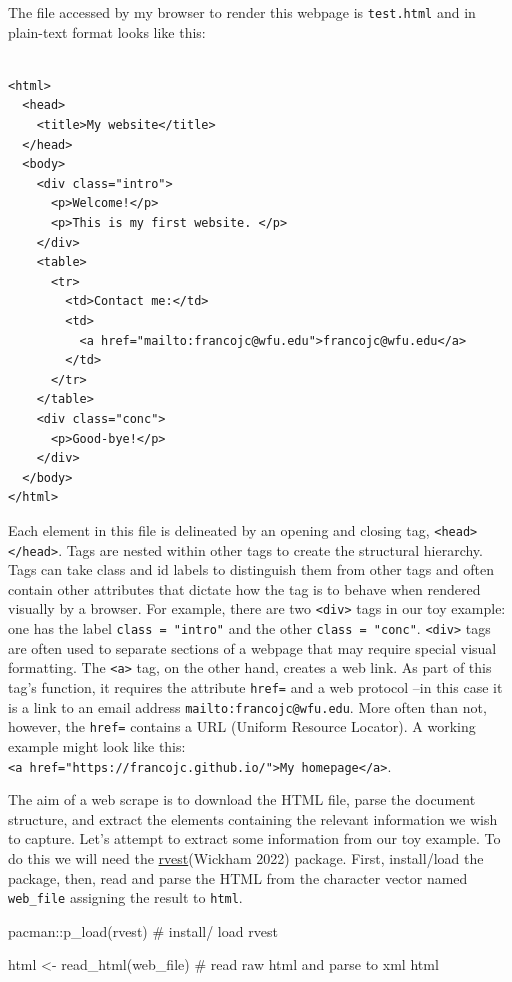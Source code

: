 \documentclass[
  letterpaper,
]{latex/krantz}
\newenvironment{Shaded}{\begin{snugshade}}{\end{snugshade}}
\newcommand{\CommentTok}[1]{\textcolor[rgb]{0.37,0.37,0.37}{#1}}
\newcommand{\FunctionTok}[1]{\textcolor[rgb]{0.28,0.35,0.67}{#1}}
\newcommand{\NormalTok}[1]{\textcolor[rgb]{0.00,0.23,0.31}{#1}}
\newcommand{\OtherTok}[1]{\textcolor[rgb]{0.00,0.23,0.31}{#1}}
\newcommand{\SpecialCharTok}[1]{\textcolor[rgb]{0.37,0.37,0.37}{#1}}
\begin{document}
The file accessed by my browser to render this webpage is
\texttt{test.html} and in plain-text format looks like this:

\begin{verbatim}

<html>
  <head>
    <title>My website</title>
  </head>
  <body>
    <div class="intro">
      <p>Welcome!</p>
      <p>This is my first website. </p>
    </div>
    <table>
      <tr>
        <td>Contact me:</td>
        <td>
          <a href="mailto:francojc@wfu.edu">francojc@wfu.edu</a>
        </td>
      </tr>
    </table>
    <div class="conc">
      <p>Good-bye!</p>
    </div>
  </body>
</html>
\end{verbatim}

Each element in this file is delineated by an opening and closing tag,
\texttt{\textless{}head\textgreater{}\textless{}/head\textgreater{}}.
Tags are nested within other tags to create the structural hierarchy.
Tags can take class and id labels to distinguish them from other tags
and often contain other attributes that dictate how the tag is to behave
when rendered visually by a browser. For example, there are two
\texttt{\textless{}div\textgreater{}} tags in our toy example: one has
the label \texttt{class\ =\ "intro"} and the other
\texttt{class\ =\ "conc"}. \texttt{\textless{}div\textgreater{}} tags
are often used to separate sections of a webpage that may require
special visual formatting. The \texttt{\textless{}a\textgreater{}} tag,
on the other hand, creates a web link. As part of this tag's function,
it requires the attribute \texttt{href=} and a web protocol --in this
case it is a link to an email address \texttt{mailto:francojc@wfu.edu}.
More often than not, however, the \texttt{href=} contains a URL (Uniform
Resource Locator). A working example might look like this:
\texttt{\textless{}a\ href="https://francojc.github.io/"\textgreater{}My\ homepage\textless{}/a\textgreater{}}.

The aim of a web scrape is to download the HTML file, parse the document
structure, and extract the elements containing the relevant information
we wish to capture. Let's attempt to extract some information from our
toy example. To do this we will need the
\href{https://CRAN.R-project.org/package=rvest}{rvest}(Wickham 2022)
package. First, install/load the package, then, read and parse the HTML
from the character vector named \texttt{web\_file} assigning the result
to \texttt{html}.

\begin{Shaded}
\begin{Highlighting}[]
\NormalTok{pacman}\SpecialCharTok{::}\FunctionTok{p\_load}\NormalTok{(rvest) }\CommentTok{\# install/ load \textasciigrave{}rvest\textasciigrave{}}

\NormalTok{html }\OtherTok{\textless{}{-}} \FunctionTok{read\_html}\NormalTok{(web\_file) }\CommentTok{\# read raw html and parse to xml}
\NormalTok{html}
\end{Highlighting}
\end{Shaded}
\end{document}
